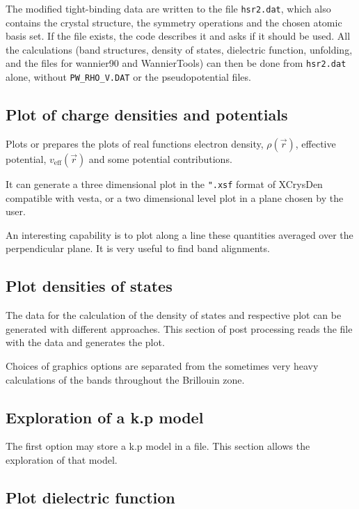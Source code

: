 \documentclass[11pt]{article}
\begin{document}
The modified tight-binding data are written to the file \texttt{hsr2.dat}, which also
contains the crystal structure, the symmetry operations and the chosen atomic basis set.
If the file exists, the code describes it and asks if it should be used.  All the
calculations (band structures, density of states, dielectric function, unfolding, and the
files for {\sc wannier90} and {\sc WannierTools}) can then be done from \texttt{hsr2.dat}
alone, without \texttt{PW\_RHO\_V.DAT} or the pseudopotential files.

\subsection{Plot of charge densities and potentials}

Plots or prepares the plots of real functions electron density, $\rho(\vec r)$, effective potential,
$v_\text{eff}(\vec r)$ and some potential contributions.

It can generate a three dimensional plot in the \texttt{".xsf} format of {\sc XCrysDen}
compatible with {\sc vesta}, or a two dimensional level plot in a plane chosen by the user.

An interesting capability is to plot along a line these quantities averaged over the
perpendicular plane.  It is very useful to find band alignments.

\subsection{Plot densities of states}

The data for the calculation of the density of states and respective plot
can be generated with different approaches.  This section of
post processing reads the file with the data and generates the plot.

Choices of graphics options are separated from the sometimes very heavy calculations of
the bands throughout the Brillouin zone.

\subsection{Exploration of a k.p model}

The first option may store a k.p model in a file.
This section allows the exploration of that model.

\subsection{Plot dielectric function}
\end{document}
